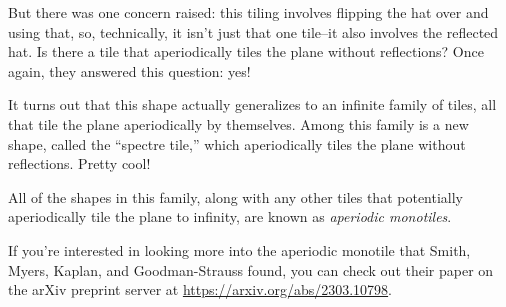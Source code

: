 \documentclass{article}
\begin{document}
But there was one concern raised: this tiling involves flipping the hat over and using that, so, technically, it isn't just that one tile--it also involves the reflected hat. Is there a tile that aperiodically tiles the plane without reflections? Once again, they answered this question: yes!

It turns out that this shape actually generalizes to an infinite family of tiles, all that tile the plane aperiodically by themselves. Among this family is a new shape, called the ``spectre tile,'' which aperiodically tiles the plane without reflections. Pretty cool!

All of the shapes in this family, along with any other tiles that potentially aperiodically tile the plane to infinity, are known as \textit{aperiodic monotiles}.

If you're interested in looking more into the aperiodic monotile that Smith, Myers, Kaplan, and Goodman-Strauss found, you can check out their paper on the arXiv preprint server at \url{https://arxiv.org/abs/2303.10798}.
\end{document}
